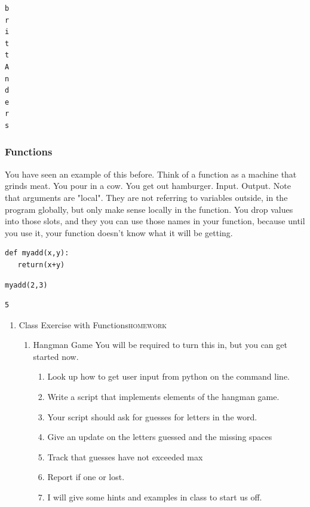 \documentclass{article}
\begin{document}
\begin{enumerate}
\begin{enumerate}
\begin{verbatim}
b
r
i
t
t
A
n
d
e
r
s
\end{verbatim}
\end{enumerate}
\end{enumerate}

\subsubsection{Functions}
\label{sec:org4175133}
You have seen an example of this before. Think of a function as a machine that grinds meat. You pour in a cow. You get out hamburger. Input. Output. Note that arguments are "local". They are not referring to variables outside, in the program globally, but only make sense locally in the function. You drop values into those slots, and they you can use those names  in your function, because until you use it, your function doesn't know what it will be getting. 
\begin{verbatim}
def myadd(x,y):
   return(x+y)
\end{verbatim}

\begin{verbatim}
myadd(2,3)
\end{verbatim}

\begin{verbatim}
5
\end{verbatim}

\begin{enumerate}
\item Class Exercise with Functions\hfill{}\textsc{homework}
\label{sec:org19a7f37}

\begin{enumerate}
\item Hangman Game
\label{sec:org159fcf3}
You will be required to turn this in, but you can get started now. 
\begin{enumerate}
\item Look up how to get user input from python on the command line.
\item Write a script that implements elements of the hangman game.
\item Your script should ask for guesses for letters in the word.
\item Give an update on the letters guessed and the missing spaces
\item Track that guesses have not exceeded max
\item Report if one or lost.
\item I will give some hints and examples in class to start us off.
\end{enumerate}
\end{enumerate}
\end{enumerate}
\end{document}
